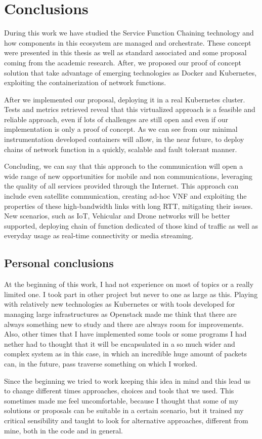 \chapter{Conclusions}
\label{chap:conclusions}

During this work we have studied the Service Function Chaining
technology and how components in this ecosystem are managed and orchestrate.
These concept were presented in this thesis as well as standard associated and
some proposal coming from the academic research. After, we proposed our
proof of concept solution that take advantage of emerging technologies as Docker
and Kubernetes, exploiting the containerization of network functions.

After we implemented our proposal, deploying it in a real Kubernetes cluster.
Tests and metrics retrieved reveal that this virtualized approach is a feasible
and reliable approach, even if lots of challenges are still open and even if our
implementation is only a proof of concept. As we can see from our
minimal instrumentation developed containers will allow, in the near future, to
deploy chains of network function in a quickly, scalable and fault tolerant
manner. 

Concluding, we can say that this approach to the communication will open a wide
range of new opportunities for mobile and non communications, leveraging the
quality of all services provided through the Internet. This approach can include
even satellite communication, creating ad-hoc VNF and exploiting the properties
of these high-bandwidth links with long RTT, mitigating their issues. New
scenarios, such as IoT, Vehicular and Drone networks will be better supported,
deploying chain of function dedicated of those kind of traffic as well as
everyday usage as real-time connectivity or media streaming.

\section*{Personal conclusions}
At the beginning of this work, I had not experience on most of topics or a
really limited one. I took part in other project but never to one as large as
this. Playing with relatively new technologies as Kubernetes or with tools
developed for managing large infrastructures as Openstack made me think that
there are always something new to study and there are always room for
improvements. Also, other times that I have implemented some tools or some
programs I had nether had to thought that it will be encapsulated in a so much
wider and complex system as in this case, in which an incredible huge amount of
packets can, in the future, pass traverse something on which I worked.

Since the beginning we tried to work keeping this idea in mind and this lead us
to change different times approaches, choices and tools that we used. This
sometimes made me feel uncomfortable, because I thought that some of my
solutions or proposals can be suitable in a certain scenario, but it trained my
critical sensibility and taught to look for alternative approaches, different
from mine, both in the code and in general.